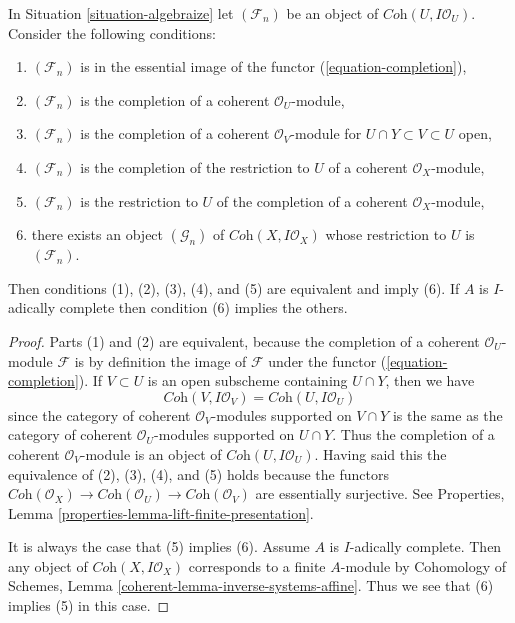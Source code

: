 \begin{lemma}
\label{lemma-essential-image-completion}
In Situation \ref{situation-algebraize} let $(\mathcal{F}_n)$
be an object of $\textit{Coh}(U, I\mathcal{O}_U)$. Consider the
following conditions:
\begin{enumerate}
\item $(\mathcal{F}_n)$ is in the essential image
of the functor (\ref{equation-completion}),
\item $(\mathcal{F}_n)$ is the completion of a
coherent $\mathcal{O}_U$-module,
\item $(\mathcal{F}_n)$ is the completion of a coherent
$\mathcal{O}_V$-module for $U \cap Y \subset V \subset U$ open,
\item $(\mathcal{F}_n)$ is the completion of
the restriction to $U$ of a coherent $\mathcal{O}_X$-module,
\item $(\mathcal{F}_n)$ is the restriction to $U$ of
the completion of a coherent $\mathcal{O}_X$-module,
\item there exists an object $(\mathcal{G}_n)$ of
$\textit{Coh}(X, I\mathcal{O}_X)$ whose restriction
to $U$ is $(\mathcal{F}_n)$.
\end{enumerate}
Then conditions (1), (2), (3), (4), and (5) are equivalent and imply (6).
If $A$ is $I$-adically complete then condition (6) implies the others.
\end{lemma}

\begin{proof}
Parts (1) and (2) are equivalent, because the completion of a coherent
$\mathcal{O}_U$-module $\mathcal{F}$ is by definition the image of
$\mathcal{F}$ under the functor (\ref{equation-completion}).
If $V \subset U$ is an open subscheme containing $U \cap Y$, then we have
$$
\textit{Coh}(V, I\mathcal{O}_V) =
\textit{Coh}(U, I\mathcal{O}_U)
$$
since the category of coherent $\mathcal{O}_V$-modules supported on
$V \cap Y$ is the same as the category of coherent $\mathcal{O}_U$-modules
supported on $U \cap Y$. Thus the completion of a coherent
$\mathcal{O}_V$-module is an object of $\textit{Coh}(U, I\mathcal{O}_U)$.
Having said this the equivalence of (2), (3), (4), and (5)
holds because the functors
$\textit{Coh}(\mathcal{O}_X) \to \textit{Coh}(\mathcal{O}_U) \to
\textit{Coh}(\mathcal{O}_V)$ are essentially surjective.
See Properties, Lemma \ref{properties-lemma-lift-finite-presentation}.

\medskip\noindent
It is always the case that (5) implies (6). Assume $A$ is $I$-adically complete.
Then any object of $\textit{Coh}(X, I\mathcal{O}_X)$ corresponds to a finite
$A$-module by Cohomology of Schemes, Lemma
\ref{coherent-lemma-inverse-systems-affine}.
Thus we see that (6) implies (5) in this case.
\end{proof}

